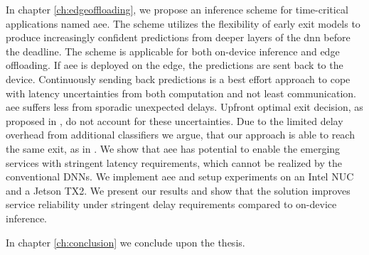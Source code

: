 In chapter \ref{ch:edgeoffloading}, we propose an inference scheme for time-critical applications named \acrfull{aee}. The scheme utilizes the flexibility of early exit models to produce increasingly confident predictions from deeper layers of the \gls{dnn} before the deadline. The scheme is applicable for both on-device inference and edge offloading. If \gls{aee} is deployed on the edge, the predictions are sent back to the device. Continuously sending back predictions is a best effort approach to cope with latency uncertainties from both computation and not least communication. \gls{aee} suffers less from sporadic unexpected delays. Upfront optimal exit decision, as proposed in \cite{li_edge_2018}, do not account for these uncertainties. Due to the limited delay overhead from additional classifiers we argue, that our approach is able to reach the same exit, as in \cite{li_edge_2018}. We show that \gls{aee} has potential to enable the emerging services with stringent latency requirements, which cannot be realized by the conventional DNNs. We implement \gls{aee} and setup experiments on an Intel NUC and a Jetson TX2. We present our results and show that the solution improves service reliability under stringent delay requirements compared to on-device inference.

In chapter \ref{ch:conclusion} we conclude upon the thesis.